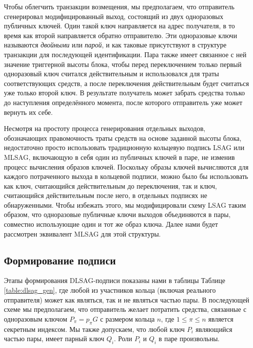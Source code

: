 \documentclass{mrl}
\begin{document}
Чтобы облегчить транзакции возмещения, мы предполагаем, что отправитель сгенерировал модифицированный выход, состоящий из двух одноразовых публичных ключей. Один такой ключ направляется на адрес получателя, в то время как второй направляется обратно отправителю. Эти одноразовые ключи называются \textit{двойными} или \textit{парой}, и как таковые присутствуют в структуре транзакции для последующей идентификации. Пара также имеет связанное с ней значение триггерной высоты блока, чтобы перед переключением только первый одноразовый ключ считался действительным и использовался для траты соответствующих средств, а после переключения действительным будет считаться уже только второй ключ. В результате получатель может забрать средства только до наступления определённого момента, после которого отправитель уже может вернуть их себе.

Несмотря на простоту процесса генерирования отдельных выходов, обозначающих правомочность траты средств на основе заданной высоты блока, недостаточно просто использовать традиционную кольцевую подпись LSAG или MLSAG, включающую в себя один из публичных ключей в паре, не изменив процесс вычисления образов ключей. Поскольку образы ключей вычисляются для каждого потраченного выхода в кольцевой подписи, можно было бы использовать как ключ, считающийся действительным до переключения, так и ключ, считающийся действительным после него, в отдельных подписях не обнаруженными. Чтобы избежать этого, мы модифицировали схему LSAG таким образом, что одноразовые публичные ключи выходов объединяются в пары, совместно использующие один и тот же образ ключа. Далее нами будет рассмотрен эквивалент MLSAG для этой структуры.

\subsection{Формирование подписи}
Этапы формирования DLSAG-подписи показаны нами в таблицы Таблице \ref{table:dlsag_gen}, где любой из участников кольца (включая реального отправителя) может как являться, так и не являться частью пары. В последующей схеме мы предполагаем, что отправитель желает потратить средства, связанные с одноразовым ключом $P_\pi = p_\pi G$ с размером кольца $n$, где $1 \leq \pi \leq n$ является секретным индексом. Мы также допускаем, что любой ключ $P_i$ являющийся частью пары, имеет парный ключ $Q_i$. Роли $P_i$ и $Q_i$ в паре произвольны.
\end{document}
